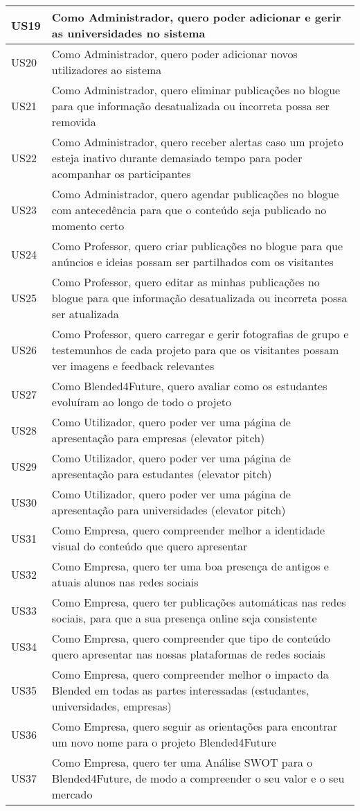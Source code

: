 \begin{landscape}
\begin{longtable}{lp{20cm}}
    US19 & Como Administrador, quero poder adicionar e gerir as universidades no sistema \\ \hline
    US20 & Como Administrador, quero poder adicionar novos utilizadores ao sistema \\ \hline
    US21 & Como Administrador, quero eliminar publicações no blogue para que informação desatualizada ou incorreta possa ser removida \\ \hline
    US22 & Como Administrador, quero receber alertas caso um projeto esteja inativo durante demasiado tempo para poder acompanhar os participantes \\ \hline
    US23 & Como Administrador, quero agendar publicações no blogue com antecedência para que o conteúdo seja publicado no momento certo \\ \hline
    US24 & Como Professor, quero criar publicações no blogue para que anúncios e ideias possam ser partilhados com os visitantes \\ \hline
    US25 & Como Professor, quero editar as minhas publicações no blogue para que informação desatualizada ou incorreta possa ser atualizada \\ \hline
    US26 & Como Professor, quero carregar e gerir fotografias de grupo e testemunhos de cada projeto para que os visitantes possam ver imagens e feedback relevantes \\ \hline
    US27 & Como Blended4Future, quero avaliar como os estudantes evoluíram ao longo de todo o projeto \\ \hline
    US28 & Como Utilizador, quero poder ver uma página de apresentação para empresas (elevator pitch) \\ \hline
    US29 & Como Utilizador, quero poder ver uma página de apresentação para estudantes (elevator pitch) \\ \hline
    US30 & Como Utilizador, quero poder ver uma página de apresentação para universidades (elevator pitch) \\ \hline
    US31 & Como Empresa, quero compreender melhor a identidade visual do conteúdo que quero apresentar \\ \hline
    US32 & Como Empresa, quero ter uma boa presença de antigos e atuais alunos nas redes sociais \\ \hline
    US33 & Como Empresa, quero ter publicações automáticas nas redes sociais, para que a sua presença online seja consistente \\ \hline
    US34 & Como Empresa, quero compreender que tipo de conteúdo quero apresentar nas nossas plataformas de redes sociais \\ \hline
    US35 & Como Empresa, quero compreender melhor o impacto da Blended em todas as partes interessadas (estudantes, universidades, empresas) \\ \hline
    US36 & Como Empresa, quero seguir as orientações para encontrar um novo nome para o projeto Blended4Future \\ \hline
    US37 & Como Empresa, quero ter uma Análise SWOT para o Blended4Future, de modo a compreender o seu valor e o seu mercado \\ \hline


\end{longtable}
\end{landscape}

